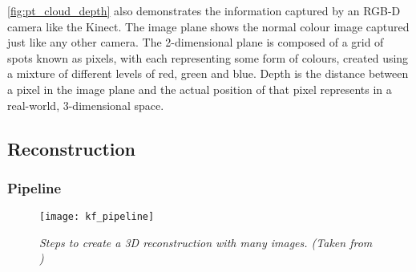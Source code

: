 \autoref{fig:pt_cloud_depth} also demonstrates the information captured by an RGB-D camera like the Kinect. The image plane shows the normal colour image captured just like any other camera. The 2-dimensional plane is composed of a grid of spots known as pixels, with each representing some form of colours, created using a mixture of different levels of red, green and blue. Depth is the distance between a pixel in the image plane and the actual position of that pixel represents in a real-world, 3-dimensional space.

\subsection{Reconstruction}
\subsubsection{Pipeline}

\begin{figure}
  \centering
  \texttt{[image: kf\_pipeline]}
  \caption{\textit{Steps to create a 3D reconstruction with many images. (Taken from \protect\cite{kinect-doc})}}
  \label{fig:k-means}
\end{figure}

